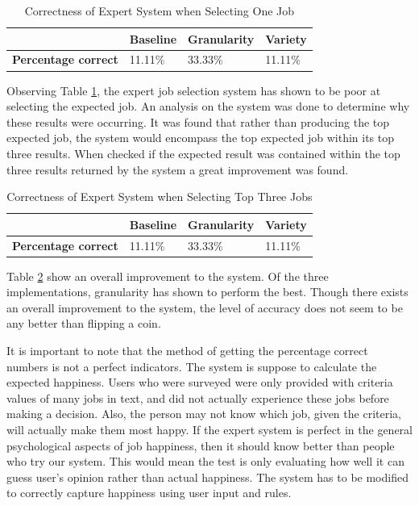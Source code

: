 \documentclass[12pt,fleqn,reqno,letterpaper]{article}
\begin{document}
\begin{table}[h]
  \caption{Correctness of Expert System when Selecting One Job}
    \label{tbl:INIT-RESULTS}
    \centering
\begin{tabular}{|l|l|l|l|}
\hline
                            & \textbf{Baseline} & \textbf{Granularity} & \textbf{Variety} \\ \hline
\textbf{Percentage correct} & 11.11\%           & 33.33\%              & 11.11\%          \\ \hline
\end{tabular}
\end{table}

Observing Table \ref{tbl:INIT-RESULTS}, the expert job selection system has shown to be poor at selecting the expected job.  An analysis on the system was done to determine why these results were occurring.  It was found that rather than producing the top expected job, the system would encompass the top expected job within its top three results.  When checked if the expected result was contained within the top three results returned by the system a great improvement was found.

\begin{table}[h]
  \caption{Correctness of Expert System when Selecting Top Three Jobs}
    \label{tbl:IMPROVE-RESULTS}
    \centering
\begin{tabular}{|l|l|l|l|}
\hline
                            & \textbf{Baseline} & \textbf{Granularity} & \textbf{Variety} \\ \hline
\textbf{Percentage correct} & 11.11\%           & 33.33\%              & 11.11\%          \\ \hline
\end{tabular}
\end{table}

Table \ref{tbl:IMPROVE-RESULTS} show an overall improvement to the system.  Of the three implementations, granularity has shown to perform the best.  Though there exists an overall improvement to the system, the level of accuracy does not seem to be any better than  flipping a coin.

It is important to note that the method of getting the percentage correct numbers is not a perfect indicators. The system is suppose to calculate the expected happiness. Users who were surveyed were only provided with criteria values of many jobs in text, and did not actually experience these jobs before making a decision. Also, the person may not know which job, given the criteria, will actually make them most happy. If the expert system is perfect in the general psychological aspects of job happiness, then it should know better than people who try our system. This would mean the test is only evaluating how well it can guess user’s opinion rather than actual happiness. The system has to be modified to correctly capture happiness using user input and rules.
\end{document}
